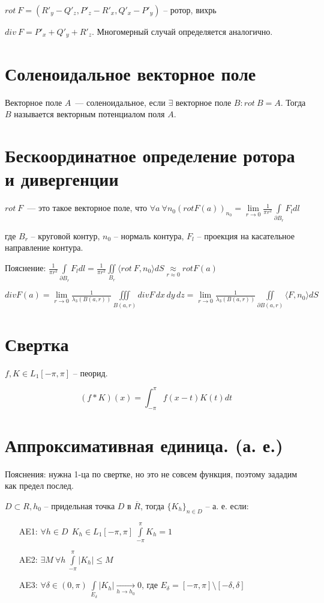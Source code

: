 \documentclass[paper=a4, fontsize=17pt]{article}
\begin{document}
	$ rot\ F = (R'_y - Q'_z, P'_z - R'_x, Q'_x - P'_y) $ -- ротор, вихрь

	$div\ F = P'_x + Q'_y + R'_z$. Многомерный случай определяется аналогично.

	\section{Соленоидальное векторное поле}
	Векторное поле $A$~--- соленоидальное, если $\exists$ векторное поле $B: rot\ B = A$. Тогда $B$ называется векторным потенциалом поля $A$.

	\section{Бескоординатное определение ротора и дивергенции}
	$rot\ F$~--- это такое векторное поле, что $\forall a \ \forall n_0 (rot F(a))_{n_0} = \lim\limits_{r\to 0} \frac{1}{\pi r^2} \int\limits_{\partial B_r} F_ldl$
		
	где $ B_r $ -- круговой контур, $ n_0 $ -- нормаль контура, $ F_l $ -- проекция на касательное направление контура. 

	Пояснение: $ \frac{1}{\pi r^2} \int\limits_{\partial B_r} F_ldl =  \frac{1}{\pi r^2} \iint\limits_{B_r} \langle rot\ F, n_0 \rangle dS \underset{r \approx 0}{\approx} rot F(a)$
	


	$div F(a) = \lim\limits_{r\to 0} \frac{1}{\lambda_3(B(a,r))} \iiint\limits_{B(a,r)} div F \,dx\,dy\,dz = \lim\limits_{r\to 0} \frac{1}{\lambda_3(B(a,r))} \iint\limits_{\partial B(a,r)} \langle F, n_0 \rangle dS$

	\section{Свертка}
	$ f, K \in L_1[-\pi, \pi]$  -- пеорид.

	$$ (f \ast K)(x) = \int_{-\pi}^{\pi} f(x-t)K(t) dt$$

\section{Аппроксимативная единица. (а. е.)}
	
	Пояснения: нужна 1-ца по свертке, но это не совсем функция, поэтому зададим как предел послед.
	
	$ D \subset R, h_0 $ -- придельная точка $ D $ в $ \overline{R} $, 
	тогда $ \{K_h\}_{n \in D}$ -- а. е. если:
	\begin{itemize}
		\item[AE1: ] $ \forall h \in D ~~ K_h \in L_1[-\pi, \pi] ~ \int\limits_{-\pi}^{\pi} K_h = 1 $
		\item[AE2: ] $ \exists M ~ \forall h ~ \int\limits_{-\pi}^{\pi} |K_h| \leq M $
		\item[AE3: ] $ \forall \delta \in (0, \pi) ~  \int\limits_{E_\delta} | K_h | 
		\underset{h \rightarrow h_0}{\rightarrow} 0  $, где $E_{\delta} = [-\pi,\pi] \setminus [-\delta,\delta]$
	\end{itemize}
	
\end{document}
